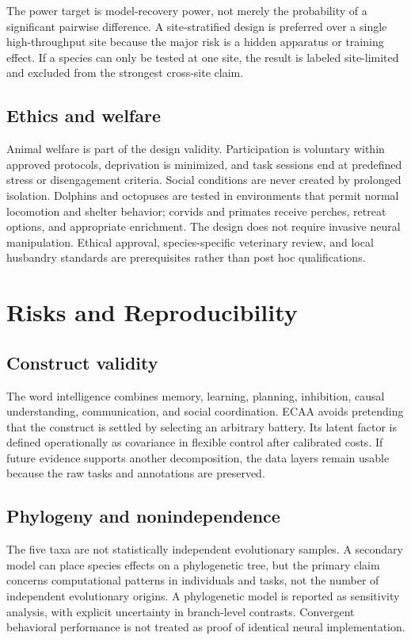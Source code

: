 \documentclass[conference]{IEEEtran}
\begin{document}
The power target is model-recovery power, not merely the probability of a significant pairwise difference. A site-stratified design is preferred over a single high-throughput site because the major risk is a hidden apparatus or training effect. If a species can only be tested at one site, the result is labeled site-limited and excluded from the strongest cross-site claim.

\subsection{Ethics and welfare}
Animal welfare is part of the design validity. Participation is voluntary within approved protocols, deprivation is minimized, and task sessions end at predefined stress or disengagement criteria. Social conditions are never created by prolonged isolation. Dolphins and octopuses are tested in environments that permit normal locomotion and shelter behavior; corvids and primates receive perches, retreat options, and appropriate enrichment. The design does not require invasive neural manipulation. Ethical approval, species-specific veterinary review, and local husbandry standards are prerequisites rather than post hoc qualifications.

\section{Risks and Reproducibility}
\subsection{Construct validity}
The word intelligence combines memory, learning, planning, inhibition, causal understanding, communication, and social coordination. ECAA avoids pretending that the construct is settled by selecting an arbitrary battery. Its latent factor is defined operationally as covariance in flexible control after calibrated costs. If future evidence supports another decomposition, the data layers remain usable because the raw tasks and annotations are preserved.

\subsection{Phylogeny and nonindependence}
The five taxa are not statistically independent evolutionary samples. A secondary model can place species effects on a phylogenetic tree, but the primary claim concerns computational patterns in individuals and tasks, not the number of independent evolutionary origins. A phylogenetic model is reported as sensitivity analysis, with explicit uncertainty in branch-level contrasts. Convergent behavioral performance is not treated as proof of identical neural implementation.
\end{document}
